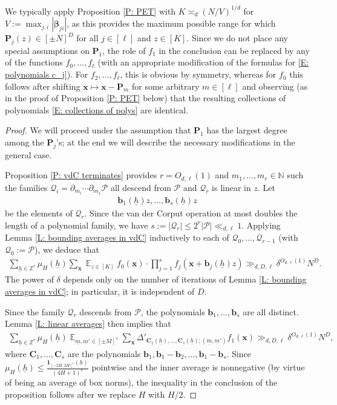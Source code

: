 \documentclass[11pt]{amsart}
\theoremstyle{definition}
\DeclareMathOperator*{\E}{\mathbb{E}}
\newcommand{\N}{{\mathbb N}}
\newcommand{\Z}{{\mathbb Z}}
\newcommand{\CP}{{\mathcal P}}
\newcommand{\CQ}{{\mathcal Q}}
\renewcommand{\b}{{\mathbf{b}}}
\newcommand{\bc}{{\mathbf{C}}}
\newcommand{\bp}{{\mathbf{P}}}
\newcommand{\p}{{\mathbf{P}}}
\newcommand{\bx}{{\mathbf{x}}}
\newcommand{\bbeta}{{\boldsymbol{\beta}}}
\newcommand{\uh}{{\underline{h}}}
\newcommand{\um}{{\underline{m}}}
\begin{document}
We typically apply Proposition \ref{P: PET} with $K\asymp_d (N/V)^{1/d}$ for $V := \max_{j,i}|\bbeta_{ji}|$, as this provides the maximum possible range for which $\bp_j(z)\in[\pm N]^D$ for all $j\in[\ell]$ and $z\in[K]$. Since we do not place any special assumptions on $\p_1$, the role of $f_1$ in the conclusion can be replaced by any of the functions $f_0, \ldots, f_\ell$ (with an appropriate modification of the formulas for \eqref{E: polynomials c_j}). For $f_2, \ldots, f_\ell$, this is obvious by symmetry, whereas for $f_0$ this follows after shifting $\bx \mapsto\bx - \bp_m$ for some arbitrary $m\in[\ell]$ and observing (as in the proof of Proposition \ref{P: PET} below) that the resulting collections of polynomials \eqref{E: collections of polys} are identical. 


  
  \begin{proof}
      We will proceed under the assumption that $\p_1$ has the largest degree among the $\p_j$'s; at the end we will describe the necessary modifications in the general case. 
      
      Proposition  \ref{P: vdC terminates} provides $r=O_{d,\ell}(1)$ and $m_1, \ldots, m_r\in\N$ such the families $\CQ_i = \partial_{m_i}\cdots\partial_{m_1}\CP$ all descend from $\CP$ and $\CQ_r$ is linear in $z$.  Let 
      \begin{align*}
            \b_{1}(\uh)z, \ldots, \b_{s}(\uh)z   
      \end{align*}
       be the elements of $\CQ_r$. Since the van der Corput operation at most doubles the length of a polynomial family, we have $s := |\CQ_{r}|\leq 2^{r}|\CP|\ll_{d, \ell} 1$. Applying Lemma \ref{L: bounding averages in vdC} inductively to each of $\CQ_0, \ldots, \CQ_{r-1}$ (with $\CQ_0 := \CP$), we deduce that 
    \begin{align*}
        \sum_{\uh\in\Z^r}\mu_H(\uh) {\sum_{\bx} \E_{z\in[K]}
        f_0(\bx)\cdot \prod_{j=1}^s f_j(\bx + \b_{j}(\uh)z) }\gg_{d, D, \ell} \delta^{O_{d, \ell}(1)} N^D.
    \end{align*}
The power of $\delta$ depends only on the number of iterations of Lemma \ref{L: bounding averages in vdC}; in particular, it is independent of $D$.
    
    Since the family $\CQ_r$ descends from $\CP$, the polynomials $\b_{1}, \ldots, \b_{s}$ are all distinct. Lemma \ref{L: linear averages} then implies that
       \begin{align*}
       \sum_{\uh\in\Z^{r}}\mu_H(\uh) \E_{\um, \um'\in[\pm M]^s}
       \sum_{\bx}\Delta'_{{\bc_1(\uh)}, \ldots, {\bc_s(\uh)}; (\um, \um')} f_1(\bx) \gg_{d, D, \ell} \delta^{O_{d, \ell}(1)} N^D,
   \end{align*}
   where $\bc_1, \ldots, \bc_s$ are the polynomials $\b_{1}, \b_{1}-\b_{2}, \ldots, \b_{1} - \b_{s}$. Since $\mu_H(\uh)\leq \frac{\mathbf{1}_{[-2H,2H]^r}(\uh)}{(4H+1)^r}$ pointwise and the inner average is nonnegative (by virtue of being an average of box norms), the inequality in the conclusion of the proposition follows after we replace $H$ with $H/2$.
    

\end{proof}
\end{document}
